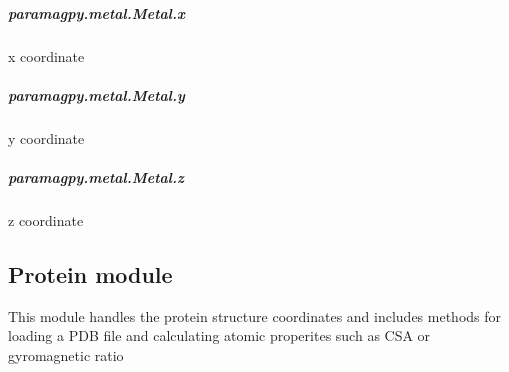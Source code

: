 \documentclass[a4paper,10pt,english,openany,oneside]{sphinxmanual}
\begin{document}
\begin{fulllineitems}
\begin{fulllineitems}
\begin{fulllineitems}
\end{fulllineitems}



\subparagraph{paramagpy.metal.Metal.x}
\label{\detokenize{reference/generated/paramagpy.metal.Metal.x:paramagpy-metal-metal-x}}\label{\detokenize{reference/generated/paramagpy.metal.Metal.x::doc}}

\begin{fulllineitems}
\label{\detokenize{reference/generated/paramagpy.metal.Metal.x:paramagpy.metal.Metal.x}}
x coordinate

\end{fulllineitems}



\subparagraph{paramagpy.metal.Metal.y}
\label{\detokenize{reference/generated/paramagpy.metal.Metal.y:paramagpy-metal-metal-y}}\label{\detokenize{reference/generated/paramagpy.metal.Metal.y::doc}}

\begin{fulllineitems}
\label{\detokenize{reference/generated/paramagpy.metal.Metal.y:paramagpy.metal.Metal.y}}
y coordinate

\end{fulllineitems}



\subparagraph{paramagpy.metal.Metal.z}
\label{\detokenize{reference/generated/paramagpy.metal.Metal.z:paramagpy-metal-metal-z}}\label{\detokenize{reference/generated/paramagpy.metal.Metal.z::doc}}

\begin{fulllineitems}
\label{\detokenize{reference/generated/paramagpy.metal.Metal.z:paramagpy.metal.Metal.z}}
z coordinate

\end{fulllineitems}


\end{fulllineitems}


\end{fulllineitems}



\subsection{Protein module}
\label{\detokenize{reference/index:protein-module}}
This module handles the protein structure coordinates and includes methods for
loading a PDB file and calculating atomic properites such as CSA or gyromagnetic ratio
\end{document}
